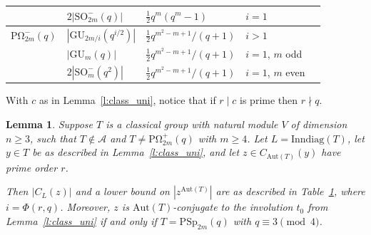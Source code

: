 \documentclass[twoside,a4paper,reqno,11pt]{amsart}
\newcommand{\<}{\langle}
\renewcommand{\>}{\rangle}
\newcommand{\geqs}{\geqslant}
\newcommand{\Aut}{\mathrm{Aut}}
\newcommand{\PSp}{\mathrm{PSp}}
\newcommand{\POmega}{\mathrm{P\Omega}}
\newcommand{\GU}{\mathrm{GU}}
\newcommand{\cmrd}{\textcolor{blue}}
\newtheorem{lem}[thm]{Lemma}
\theoremstyle{definition}
\begin{document}
{\begin{table}
\begin{tabular}{@{}lllll@{}}
            & $2|\mathrm{SO}_{2m}^-(q)|$ & $\frac{1}{2}q^m(q^m-1)$ & $i = 1$ \\
            \hline 
            $\POmega_{2m}^-(q)$  & $|\GU_{2m/i}(q^{i/2})|$ & $\frac{1}{2}q^{m^2-m+1}/(q+1)$ & $i > 1$ \\
            & $|\GU_m(q)|$ & $\frac{1}{2}q^{m^2-m+1}/(q+1)$ & $i = 1$, $m$ odd \\
            & $2|\mathrm{SO}_m^-(q^2)|$ & $\frac{1}{2}q^{m^2-m+1}/(q+1)$ & $i = 1$, $m$ even \\
			\bottomrule
		\end{tabular}
		\label{tab:class_centr}
	\end{table}
}

With $c$ as in Lemma~\ref{l:class_uni}, notice that if $r \mid c$ is  prime then %
$r \nmid q$. %
 
\begin{lem}\label{l:z_elts}
    Suppose $T$ is a classical group with natural module $V$ of dimension $n \geqs 3$,
    such that $T \not\in \mathcal{A}$ and $T \ne \POmega_{2m}^+(q)$ with $m\geqs 4$. Let $L = \mathrm{Inndiag}(T)$, let $y \in T$ be as described in Lemma~\ref{l:class_uni}, and let $z \in C_{\Aut(T)}(y)$ have prime order $r$. %
       
    
    Then $|C_L(z)|$ and a lower bound on $|z^{\Aut(T)}|$ are as described in Table~\ref{tab:class_centr}, where $i = \Phi(r,q)$. Moreover, $z$ is $\Aut(T)$-conjugate to the involution $t_0$ from Lemma~\ref{l:class_uni} if and only if $T = \PSp_{2m}(q)$ with $q\equiv 3\pmod 4$.
\end{lem}
\end{document}
